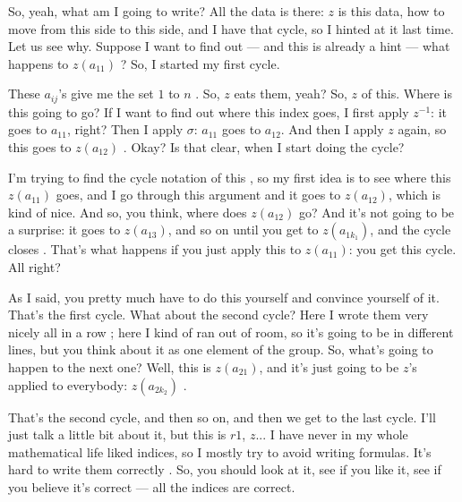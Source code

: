 \begin{speech}[00:35:00 - 00:37:24]
So, yeah, what am I going to write? All the data is there: $z$ is this data, how to move from this side to this side, and I have that cycle, so I hinted at it last time. Let us see why. Suppose I want to find out --- and this is already a hint --- what happens to $z(a_{11})$ ? So, I started my first cycle.

These $a_{ij}$'s give me the set $1$ to $n$ . So, $z$ eats them, yeah? So, $z$ of this. Where is this going to go? If I want to find out where this index goes, I first apply $z^{-1}$: it goes to $a_{11}$, right? Then I apply $\sigma$: $a_{11}$ goes to $a_{12}$. And then I apply $z$ again, so this goes to $z(a_{12})$ . Okay? Is that clear, when I start doing the cycle?

I'm trying to find the cycle notation of this , so my first idea is to see where this $z(a_{11})$ goes, and I go through this argument and it goes to $z(a_{12})$, which is kind of nice. And so, you think, where does $z(a_{12})$ go? And it's not going to be a surprise: it goes to $z(a_{13})$, and so on until you get to $z(a_{1 k_1})$, and the cycle closes . That's what happens if you just apply this to $z(a_{11})$: you get this cycle. All right?

As I said, you pretty much have to do this yourself and convince yourself of it. That's the first cycle. What about the second cycle? Here I wrote them very nicely all in a row ; here I kind of ran out of room, so it's going to be in different lines, but you think about it as one element of the group. So, what's going to happen to the next one? Well, this is $z(a_{21})$, and it's just going to be $z$'s applied to everybody: $z(a_{2 k_2})$ .

That's the second cycle, and then so on, and then we get to the last cycle. I'll just talk a little bit about it, but this is $r1$, $z$... I have never in my whole mathematical life liked indices, so I mostly try to avoid writing formulas. It's hard to write them correctly . So, you should look at it, see if you like it, see if you believe it's correct --- all the indices are correct.
\end{speech}

